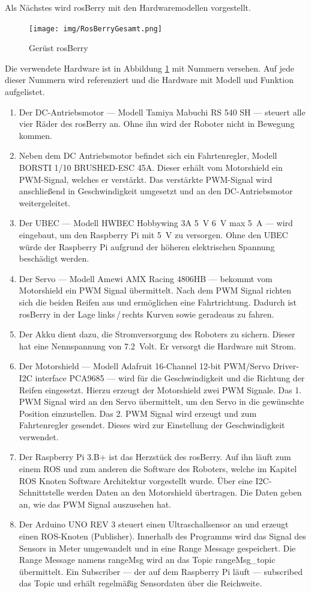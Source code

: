 \documentclass[conference]{IEEEtran}
\begin{document}
Als Nächstes wird rosBerry mit den Hardwaremodellen vorgestellt.
\\
\begin{figure}[!ht]
	\centering
	\texttt{[image: img/RosBerryGesamt.png]}
	\caption{Gerüst rosBerry}
	\label{rosBerryGesamt}
\end{figure}

Die verwendete Hardware ist in Abbildung \ref{rosBerryGesamt} mit Nummern versehen.
Auf jede dieser Nummern wird referenziert und die Hardware mit Modell und Funktion aufgelistet.

\begin{enumerate}
	\item Der DC-Antriebsmotor — Modell Tamiya Mabuchi RS 540 SH — steuert alle vier Räder des rosBerry an.
	Ohne ihn wird der Roboter nicht in Bewegung kommen.
	\item Neben dem DC Antriebsmotor befindet sich ein Fahrtenregler, Modell BORSTI 1/10 BRUSHED-ESC 45A.
	Dieser erhält vom Motorshield ein PWM-Signal, welches er verstärkt.
	Das verstärkte PWM-Signal wird anschließend in Geschwindigkeit umgesetzt und an den DC-Antriebsmotor weitergeleitet.
	\item Der UBEC — Modell HWBEC Hobbywing 3A \SI{5}{V} \SI{6}{V} max \SI{5}{A} — wird eingebaut, um den Raspberry Pi mit \SI{5}{V} zu versorgen.
	Ohne den UBEC würde der Raspberry Pi aufgrund der höheren elektrischen Spannung beschädigt werden.
	\item Der Servo — Modell Amewi AMX Racing 4806HB — bekommt vom Motorshield ein PWM Signal übermittelt.
	Nach dem PWM Signal richten sich die beiden Reifen aus und ermöglichen eine Fahrtrichtung.
	Dadurch ist rosBerry in der Lage links\,/\,rechts Kurven sowie geradeaus zu fahren.
	\item Der Akku dient dazu, die Stromversorgung des Roboters zu sichern.
	Dieser hat eine Nennspannung von \SI{7,2}{Volt}. Er versorgt die Hardware mit Strom.
	\item Der Motorshield — Modell Adafruit 16-Channel 12-bit PWM/Servo Driver-I2C interface PCA9685 — wird für die Geschwindigkeit und die Richtung der Reifen eingesetzt.
	Hierzu erzeugt der Motorshield zwei PWM Signale.
	Das 1. PWM Signal wird an den Servo übermittelt, um den Servo in die gewünschte Position einzustellen.
	Das 2. PWM Signal wird erzeugt und zum Fahrtenregler gesendet.
	Dieses wird zur Einstellung der Geschwindigkeit verwendet.
	\item Der Raspberry Pi 3.B+ ist das Herzstück des rosBerry.
	Auf ihn läuft zum einem ROS und zum anderen die Software des Roboters, welche im Kapitel ROS Knoten Software Architektur vorgestellt wurde.
	Über eine I2C-Schnittstelle werden Daten an den Motorshield übertragen.
	Die Daten geben an, wie das PWM Signal auszusehen hat.
	\item Der Arduino UNO REV 3 steuert einen Ultraschallsensor an und erzeugt einen ROS-Knoten (Publisher).
	Innerhalb des Programms wird das Signal des Sensors in Meter umgewandelt und in eine Range Message gespeichert.
	Die Range Message namens rangeMsg wird an das Topic rangeMsg\_topic übermittelt.
	Ein Subscriber — der auf dem Raspberry Pi läuft — subscribed das Topic und erhält regelmäßig Sensordaten über die Reichweite.
	

\end{enumerate}
\end{document}
